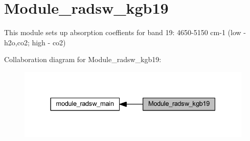 \hypertarget{group__module__radsw__kgb19}{}\section{Module\+\_\+radsw\+\_\+kgb19}
\label{group__module__radsw__kgb19}


This module sets up absorption coeffients for band 19\+: 4650-\/5150 cm-\/1 (low -\/ h2o,co2; high -\/ co2)  


Collaboration diagram for Module\+\_\+radsw\+\_\+kgb19\+:\nopagebreak
\begin{figure}[H]
\begin{center}
\leavevmode
\includegraphics[width=331pt]{group__module__radsw__kgb19}
\end{center}
\end{figure}
